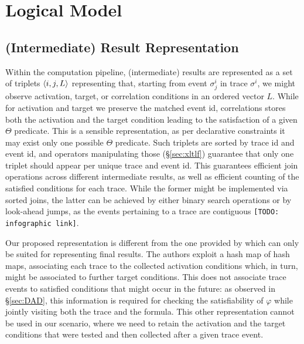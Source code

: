 \section{Logical Model}

\subsection{(Intermediate) Result Representation}
Within the computation pipeline, (intermediate) results are represented as a set of triplets $\braket{i,j,L}$ representing that, starting from event $\sigma^i_j$ in trace $\sigma^i$, we might observe activation, target, or correlation conditions in an ordered vector $L$.  While for activation and target %
we %
preserve 
the matched event id,
correlations stores
both the activation and the target condition leading to the satisfaction of a given $\Theta$ predicate. This is a sensible representation, as per declarative constraints it may exist only one possible $\Theta$ predicate. Such triplets are sorted by trace id and event id, and operators manipulating those (\S\ref{sec:xltlf}) guarantee that only one triplet should appear per unique trace and event id. This guarantees efficient join operations across different intermediate results, as well as efficient counting of the satisfied conditions for each trace. While the former might be implemented via sorted joins, the latter can be achieved by either binary search operations or by look-ahead jumps, as the events pertaining to a trace are contiguous  \texttt{\color{red}[TODO: infographic link]}.

Our proposed representation is different from the one provided by \cite{BurattinMS16} which can only be suited for representing final results. The authors exploit 
a hash map of hash maps, associating  each trace to the collected activation conditions which, in turn, might be associated to further target conditions. %
This does not associate trace events to satisfied conditions that might occur in the future: %
as observed in \S\ref{sec:DAD}, this information is required for checking the satisfiability of $\varphi$ while jointly visiting both the trace and the formula. This other representation cannot be used in our scenario, where we need to retain the activation and the target conditions that were tested and then collected after a given trace event.



